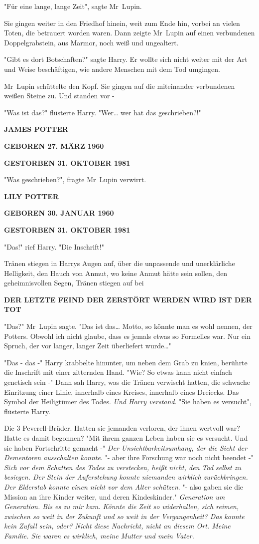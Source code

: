 {"Für eine lange, lange Zeit", sagte Mr~Lupin.

Sie gingen weiter in den Friedhof hinein, weit zum Ende hin, vorbei an vielen Toten, die betrauert worden waren. Dann zeigte Mr~Lupin auf einen verbundenen Doppelgrabstein, aus Marmor, noch weiß und ungealtert.

"Gibt es dort Botschaften?" sagte Harry. Er wollte sich nicht weiter mit der Art und Weise beschäftigen, wie andere Menschen mit dem Tod umgingen.

Mr~Lupin schüttelte den Kopf. Sie gingen auf die miteinander verbundenen weißen Steine zu. Und standen vor -

"Was ist das?" flüsterte Harry. "Wer… wer hat das geschrieben?!"

\textbf{JAMES POTTER}

\textbf{GEBOREN 27. MÄRZ 1960}

\textbf{GESTORBEN 31. OKTOBER 1981}

"Was geschrieben?", fragte Mr~Lupin verwirrt.

\textbf{LILY POTTER}

\textbf{GEBOREN 30. JANUAR 1960}

\textbf{GESTORBEN 31. OKTOBER 1981}

"Das!" rief Harry. "Die Inschrift!"

Tränen stiegen in Harrys Augen auf, über die unpassende und unerklärliche Helligkeit, den Hauch von Anmut, wo keine Anmut hätte sein sollen, den geheimnisvollen Segen, Tränen stiegen auf bei

\textbf{DER LETZTE FEIND DER ZERSTÖRT WERDEN WIRD IST DER TOT}

"Das?" Mr~Lupin sagte. "Das ist das… Motto, so könnte man es wohl nennen, der Potters. Obwohl ich nicht glaube, dass es jemals etwas so Formelles war. Nur ein Spruch, der vor langer, langer Zeit überliefert wurde…"

"Das - das -" Harry krabbelte hinunter, um neben dem Grab zu knien, berührte die Inschrift mit einer zitternden Hand. "Wie? So etwas kann nicht einfach genetisch sein -" Dann sah Harry, was die Tränen verwischt hatten, die schwache Einritzung einer Linie, innerhalb eines Kreises, innerhalb eines Dreiecks. Das Symbol der Heiligtümer des Todes. \emph{Und Harry verstand}. "Sie haben es versucht", flüsterte Harry.

Die 3 Peverell-Brüder. Hatten sie jemanden verloren, der ihnen wertvoll war? Hatte es damit begonnen? "Mit ihrem ganzen Leben haben sie es versucht. Und sie haben Fortschritte gemacht -" \emph{Der Unsichtbarkeitsumhang, der die Sicht der Dementoren ausschalten konnte}. "- aber ihre Forschung war noch nicht beendet -" \emph{Sich vor dem Schatten des Todes zu verstecken, heißt nicht, den Tod selbst zu besiegen. Der Stein der Auferstehung konnte niemanden wirklich zurückbringen. Der Elderstab konnte einen nicht vor dem Alter schützen}. "- also gaben sie die Mission an ihre Kinder weiter, und deren Kindeskinder." \emph{Generation um Generation. Bis es zu mir kam. Könnte die Zeit so widerhallen, sich reimen, zwischen so weit in der Zukunft und so weit in der Vergangenheit? Das konnte kein Zufall sein, oder? Nicht diese Nachricht, nicht an diesem Ort. Meine Familie. Sie waren es wirklich, meine Mutter und mein Vater.}

}
